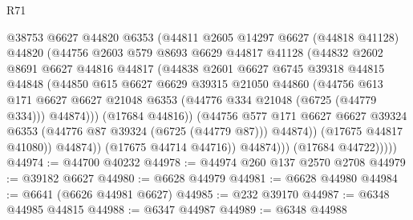 \begin{lexlean}{R71}
\begin{coremodule}
                        @38753
                        @6627
                        @44820
                        @6353
                        (@44811
                          @2605
                          @14297
                          @6627
                          (@44818 @41128)
                          @44820
                          (@44756
                            @2603
                            @579
                            @8693
                            @6629
                            @44817
                            @41128
                            (@44832
                              @2602
                              @8691
                              @6627
                              @44816
                              @44817
                              (@44838
                                @2601
                                @6627
                                @6745
                                @39318
                                @44815
                                @44848
                                (@44850
                                  @615
                                  @6627
                                  @6629
                                  @39315
                                  @21050
                                  @44860
                                  (@44756
                                    @613
                                    @171
                                    @6627
                                    @6627
                                    @21048
                                    @6353
                                    (@44776 @334 @21048 (@6725 (@44779 @334)))
                                    @44874)))
                              (@17684 @44816))
                            (@44756
                              @577
                              @171
                              @6627
                              @6627
                              @39324
                              @6353
                              (@44776 @87 @39324 (@6725 (@44779 @87)))
                              @44874))
                          (@17675 @44817 @41080))
                        @44874))
                    (@17675 @44714 @44716))
                  @44874)))
            (@17684 @44722)))))
@44974 := @44700 @40232
@44978 := @44974 @260 @137 @2570 @2708
@44979 := @39182 @6627
@44980 := @6628 @44979
@44981 := @6628 @44980
@44984 := @6641 (@6626 @44981 @6627)
@44985 := @232 @39170
@44987 := @6348 @44985 @44815
@44988 := @6347 @44987
@44989 := @6348 @44988

\end{coremodule}
\end{lexlean}
